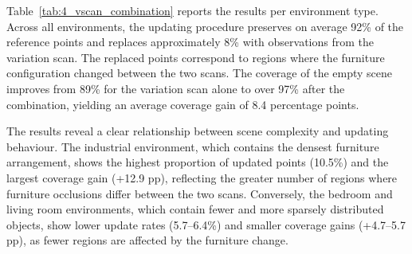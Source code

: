 Table~\ref{tab:4_vscan_combination} reports the results per environment type. Across all environments, the updating procedure preserves on average 92\% of the reference points and replaces approximately 8\% with observations from the variation scan. The replaced points correspond to regions where the furniture configuration changed between the two scans. The coverage of the empty scene improves from 89\% for the variation scan alone to over 97\% after the combination, yielding an average coverage gain of 8.4 percentage points.

\begin{table}[hb]
    \centering
    \caption[V-Scan combination results]{Updating results on V-Scan scenes per environment type. Coverage is measured against the ground-truth empty scene. All scans are subsampled to 2\,cm voxel size with a 2\,cm distance threshold.}
    \label{tab:4_vscan_combination}
    \setlength{\tabcolsep}{6pt}
\end{table}

The results reveal a clear relationship between scene complexity and updating behaviour. The industrial environment, which contains the densest furniture arrangement, shows the highest proportion of updated points (10.5\%) and the largest coverage gain (+12.9 pp), reflecting the greater number of regions where furniture occlusions differ between the two scans. Conversely, the bedroom and living room environments, which contain fewer and more sparsely distributed objects, show lower update rates (5.7--6.4\%) and smaller coverage gains (+4.7--5.7 pp), as fewer regions are affected by the furniture change.

